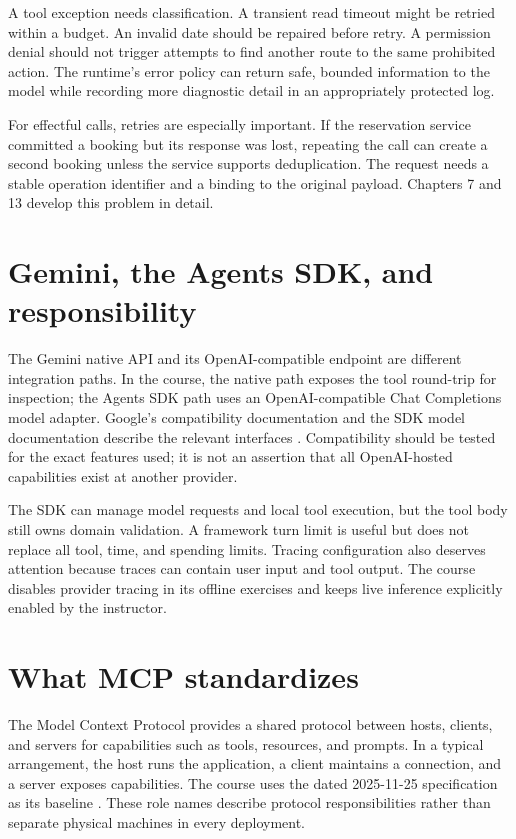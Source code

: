 A tool exception needs classification. A transient read timeout might be retried within a budget. An invalid date should be repaired before retry. A permission denial should not trigger attempts to find another route to the same prohibited action. The runtime's error policy can return safe, bounded information to the model while recording more diagnostic detail in an appropriately protected log.

For effectful calls, retries are especially important. If the reservation service committed a booking but its response was lost, repeating the call can create a second booking unless the service supports deduplication. The request needs a stable operation identifier and a binding to the original payload. Chapters 7 and 13 develop this problem in detail.

\section{Gemini, the Agents SDK, and responsibility}
The Gemini native API and its OpenAI-compatible endpoint are different integration paths. In the course, the native path exposes the tool round-trip for inspection; the Agents SDK path uses an OpenAI-compatible Chat Completions model adapter. Google's compatibility documentation and the SDK model documentation describe the relevant interfaces \cite{gemini-openai,agents-models}. Compatibility should be tested for the exact features used; it is not an assertion that all OpenAI-hosted capabilities exist at another provider.

The SDK can manage model requests and local tool execution, but the tool body still owns domain validation. A framework turn limit is useful but does not replace all tool, time, and spending limits. Tracing configuration also deserves attention because traces can contain user input and tool output. The course disables provider tracing in its offline exercises and keeps live inference explicitly enabled by the instructor.

\section{What MCP standardizes}
The Model Context Protocol provides a shared protocol between hosts, clients, and servers for capabilities such as tools, resources, and prompts. In a typical arrangement, the host runs the application, a client maintains a connection, and a server exposes capabilities. The course uses the dated 2025-11-25 specification as its baseline \cite{mcp-spec}. These role names describe protocol responsibilities rather than separate physical machines in every deployment.

